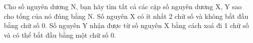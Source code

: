 Cho số nguyên dương N, bạn hãy tìm tất cả các cặp số nguyên dương X, Y sao cho tổng của nó đúng bằng N. Số nguyên X có ít nhất 2 chữ số và không bắt đầu bằng chữ số 0. Số nguyên Y nhận được từ số nguyên X bằng cách xoá đi 1 chữ số và có thể bắt đầu bằng một chữ số 0.